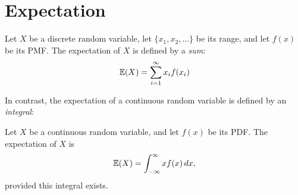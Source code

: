 %
%
%

\section{Expectation}
Let $X$ be a discrete random variable, let $\{x_1,x_2,\ldots\}$ be its range, and let $f(x)$ be its PMF. The expectation of $X$ is defined by a \emph{sum}:
\[
\mathbb{E}(X) = \sum_{i=1}^{\infty} x_i f(x_i)
\]

In contrast, the expectation of a continuous random variable is defined by an \emph{integral}:

\begin{definition}
Let $X$ be a continuous random variable, and let $f(x)$ be its PDF. The expectation of $X$ is  
\[
\mathbb{E}(X) = \int_{-\infty}^{\infty} x f(x)\,dx,
\]
provided this integral exists.
\end{definition}



